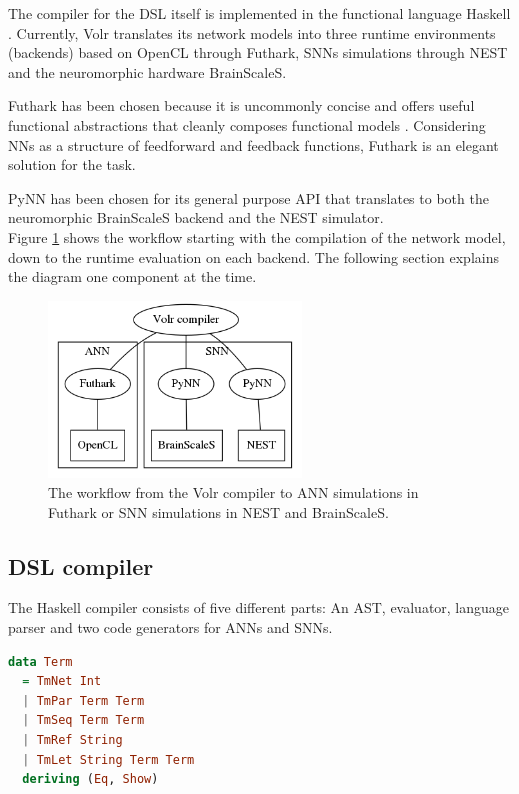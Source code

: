 The compiler for the \gls{DSL} itself is implemented in the functional language
Haskell \cite{Haskell}.
Currently, Volr translates its network models into three runtime
environments (backends) based on \gls{OpenCL} through Futhark,
\glspl{SNN} simulations through NEST and 
the neuromorphic hardware BrainScaleS.

Futhark has been chosen because it is uncommonly concise and offers
useful functional abstractions that cleanly composes functional
models \cite{Henriksen2017}.
Considering \gls{NN}s as a structure of feedforward and feedback functions,
Futhark is an elegant solution for the task.

PyNN has been chosen for its general purpose API that translates to both the
neuromorphic BrainScaleS  backend and the NEST 
 simulator.
\\[0.2cm]
Figure \ref{fig:volr-architecture} shows the workflow starting with the
compilation of the network model, down to the runtime evaluation on each backend.
The following section explains the diagram one component at the time.

\begin{figure}
  \centering
  \includegraphics[width=0.6\textwidth]{images/volr-architecture.png}
  \caption{The workflow from the Volr compiler to 
    \gls{ANN} simulations in Futhark or \gls{SNN} simulations in NEST and
    \gls{BrainScaleS}.
  }
  \label{fig:volr-architecture}
\end{figure}

\subsection{DSL compiler}
The Haskell compiler consists of five different parts:
An \gls{AST}, evaluator, language parser and two
code generators for \gls{ANN}s and \gls{SNN}s.

\lstset{mathescape=false,showstringspaces=false}
\begin{minipage}{\linewidth}
  \begin{lstlisting}[language=haskell, caption={The Volr AST in
  Haskell},label={code:term}]
data Term
  = TmNet Int 
  | TmPar Term Term
  | TmSeq Term Term
  | TmRef String
  | TmLet String Term Term
  deriving (Eq, Show)  
\end{lstlisting}
\end{minipage}

